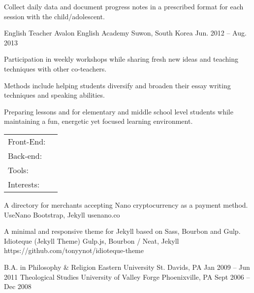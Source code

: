 \documentclass[]{awesome-cv}
\begin{document}
\begin{cventries}
{\begin{cvitems}
		\item {Collect daily data and document progress notes in a prescribed format for each session with the child/adolescent.}
		\end{cvitems}}
	\cventry
	{English Teacher}
	{Avalon English Academy}
	{Suwon, South Korea}
	{Jun. 2012 – Aug. 2013}
	{\begin{cvitems}
		\item {Participation in weekly workshops while sharing fresh new ideas and teaching techniques with other co-teachers.}
		\item {Methods include helping students diversify and broaden their essay writing techniques and speaking abilities.}
		\item {Preparing lessons and for elementary and middle school level students while maintaining a fun, energetic yet focused learning environment.}
		\end{cvitems}}
\end{cventries}
\begin{cventries}
	\cventry
	{}
	{\def\arraystretch{1.15}{\begin{tabular}{ l l }
		Front-End:  & {\skill{ HTML5, CSS3, Sass, jQuery, Node.js, Angular.js, Foundation, Bootstrap, Bourbon, Jekyll, BEM}} \\
		Back-end:  & {\skill{ LAMP stack, ExpressionEngine, Docker, Ruby / Ruby on Rails, Drupal, Wordpress}} \\
		Tools:  & {\skill{ Git, Vagrant, Bash, IPFS, Compass, Gulp}} \\
		Interests:  & {\skill{ Open-source, Entrepeneurship, Economnics, Digital privacy, Blockchain technology}} \\
		\end{tabular}}}
	{}
	{}
	{}
\end{cventries}

\vspace{-7mm}
\begin{cventries}
	\cventry
	{A directory for merchants accepting Nano cryptocurrency as a payment method.}
	{UseNano}
	{Bootstrap, Jekyll}
	{usenano.co}
	{}
	
	\vspace{-5mm}
	\cventry
	{A minimal and responsive theme for Jekyll based on Sass, Bourbon and Gulp.}
	{Idioteque (Jekyll Theme)}
	{Gulp.js, Bourbon / Neat, Jekyll}
	{https://github.com/tonyynot/idioteque-theme}
	{}
	
	\vspace{-5mm}
\end{cventries}
\begin{cventries}
	\cventry
	{B.A. in Philosophy \& Religion}
	{Eastern University}
	{St. Davids, PA}
	{Jan 2009 – Jun 2011}
	{}
	\cventry
	{Theological Studies}
	{University of Valley Forge}
	{Phoenixville, PA}
	{Sept 2006 – Dec 2008}
	{}
\end{cventries}

\vspace{-2mm}

\ 
\end{document}
